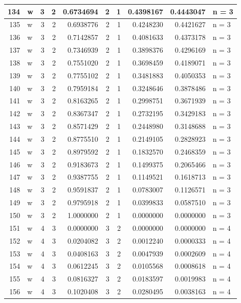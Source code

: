\documentclass[
  letterpaper,
  DIV=11,
  numbers=noendperiod]{scrreprt}
\begin{document}
\begin{table}
\begin{tabular}[t]{r|l|r|r|r|r|r|r|r|l}
\hline
134 & w & 3 & 2 & 0.6734694 & 2 & 1 & 0.4398167 & 0.4443047 & n = 3\\
\hline
135 & w & 3 & 2 & 0.6938776 & 2 & 1 & 0.4248230 & 0.4421627 & n = 3\\
\hline
136 & w & 3 & 2 & 0.7142857 & 2 & 1 & 0.4081633 & 0.4373178 & n = 3\\
\hline
137 & w & 3 & 2 & 0.7346939 & 2 & 1 & 0.3898376 & 0.4296169 & n = 3\\
\hline
138 & w & 3 & 2 & 0.7551020 & 2 & 1 & 0.3698459 & 0.4189071 & n = 3\\
\hline
139 & w & 3 & 2 & 0.7755102 & 2 & 1 & 0.3481883 & 0.4050353 & n = 3\\
\hline
140 & w & 3 & 2 & 0.7959184 & 2 & 1 & 0.3248646 & 0.3878486 & n = 3\\
\hline
141 & w & 3 & 2 & 0.8163265 & 2 & 1 & 0.2998751 & 0.3671939 & n = 3\\
\hline
142 & w & 3 & 2 & 0.8367347 & 2 & 1 & 0.2732195 & 0.3429183 & n = 3\\
\hline
143 & w & 3 & 2 & 0.8571429 & 2 & 1 & 0.2448980 & 0.3148688 & n = 3\\
\hline
144 & w & 3 & 2 & 0.8775510 & 2 & 1 & 0.2149105 & 0.2828923 & n = 3\\
\hline
145 & w & 3 & 2 & 0.8979592 & 2 & 1 & 0.1832570 & 0.2468359 & n = 3\\
\hline
146 & w & 3 & 2 & 0.9183673 & 2 & 1 & 0.1499375 & 0.2065466 & n = 3\\
\hline
147 & w & 3 & 2 & 0.9387755 & 2 & 1 & 0.1149521 & 0.1618713 & n = 3\\
\hline
148 & w & 3 & 2 & 0.9591837 & 2 & 1 & 0.0783007 & 0.1126571 & n = 3\\
\hline
149 & w & 3 & 2 & 0.9795918 & 2 & 1 & 0.0399833 & 0.0587510 & n = 3\\
\hline
150 & w & 3 & 2 & 1.0000000 & 2 & 1 & 0.0000000 & 0.0000000 & n = 3\\
\hline
151 & w & 4 & 3 & 0.0000000 & 3 & 2 & 0.0000000 & 0.0000000 & n = 4\\
\hline
152 & w & 4 & 3 & 0.0204082 & 3 & 2 & 0.0012240 & 0.0000333 & n = 4\\
\hline
153 & w & 4 & 3 & 0.0408163 & 3 & 2 & 0.0047939 & 0.0002609 & n = 4\\
\hline
154 & w & 4 & 3 & 0.0612245 & 3 & 2 & 0.0105568 & 0.0008618 & n = 4\\
\hline
155 & w & 4 & 3 & 0.0816327 & 3 & 2 & 0.0183597 & 0.0019983 & n = 4\\
\hline
156 & w & 4 & 3 & 0.1020408 & 3 & 2 & 0.0280495 & 0.0038163 & n = 4\\

\end{tabular}
\end{table}
\end{document}
